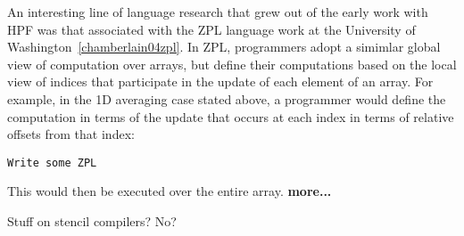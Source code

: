 An interesting line of language research that grew out of the early work
with HPF was that associated with the ZPL language work at the University
of Washington~\ref{chamberlain04zpl}.  In ZPL, programmers adopt a simimlar
global view of computation over arrays, but define their computations based
on the local view of indices that participate in the update of each element of
an array.  For example, in the 1D averaging case stated above, a programmer would
define the computation in terms of the update that occurs at each index in terms
of relative offsets from that index:

\begin{verbatim}
Write some ZPL
\end{verbatim}

This would then be executed over the entire array. {\bf more...}

Stuff on stencil compilers?  No?
